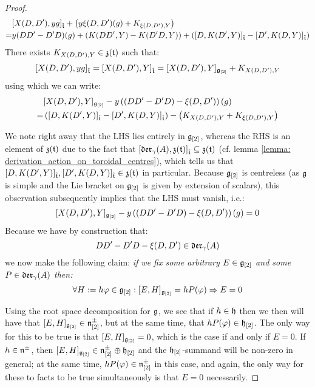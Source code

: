 \begin{proof}
                    $$
                        \begin{aligned}
                            & [ X(D, D') , y g ]_{\hat{\mathfrak{t}}} + \left( y \xi(D, D')(g) + K_{\xi(D, D'), Y} \right)
                            \\
                            = & y (DD' - D'D)( g ) + ( K(DD', Y) - K(D'D, Y) ) + ( [ D, K(D', Y) ]_{\hat{\mathfrak{t}}} - [ D', K(D, Y) ]_{\hat{\mathfrak{t}}} )
                        \end{aligned}
                    $$
                There exists $K_{X(D, D'), Y} \in \mathfrak{z}(\mathfrak{t})$ such that:
                    $$[ X(D, D') , y g ]_{\hat{\mathfrak{t}}} = [ X(D, D') , Y ]_{\hat{\mathfrak{t}}} = [X(D, D'), Y]_{\mathfrak{g}_{[2]}} + K_{X(D, D'), Y}$$
                using which we can write:
                    $$
                        \begin{aligned}
                            & [X(D, D'), Y]_{\mathfrak{g}_{[2]}} - y \left( ( DD' - D'D) - \xi(D, D') \right)( g )
                            \\
                            = & \left( [ D, K(D', Y) ]_{\hat{\mathfrak{t}}} - [ D', K(D, Y) ]_{\hat{\mathfrak{t}}} \right) - \left( K_{X(D, D'), Y} + K_{\xi(D, D'), Y} \right)
                        \end{aligned}
                    $$
                    
                We note right away that the LHS lies entirely in $\mathfrak{g}_{[2]}$, whereas the RHS is an element of $\mathfrak{z}(\mathfrak{t})$ due to the fact that $[\mathfrak{der}_{\gamma}(A), \mathfrak{z}(\mathfrak{t})]_{\hat{\mathfrak{t}}} \subseteq \mathfrak{z}(\mathfrak{t})$ (cf. lemma \ref{lemma: derivation_action_on_toroidal_centres}), which tells us that $[ D, K(D', Y) ]_{\hat{\mathfrak{t}}}, [ D', K(D, Y) ]_{\hat{\mathfrak{t}}} \in \mathfrak{z}(\mathfrak{t})$ in particular. Because $\mathfrak{g}_{[2]}$ is centreless (as $\mathfrak{g}$ is simple and the Lie bracket on $\mathfrak{g}_{[2]}$ is given by extension of scalars), this observation subsequently implies that the LHS must vanish, i.e.:
                    $$[X(D, D'), Y]_{\mathfrak{g}_{[2]}} - y \left( ( DD' - D'D) - \xi(D, D') \right)( g ) = 0$$
                Because we have by construction that:
                    $$DD' - D'D - \xi(D, D') \in \mathfrak{der}_{\gamma}(A)$$
                we now make the following claim: \textit{if we fix some arbitrary $E \in \mathfrak{g}_{[2]}$ and some $P \in \mathfrak{der}_{\gamma}(A)$ then:}
                    $$\forall H := h \varphi \in \mathfrak{g}_{[2]}: [E, H]_{\mathfrak{g}_{[2]}} = h P( \varphi ) \Rightarrow E = 0$$

                Using the root space decomposition for $\mathfrak{g}$, we see that if $h \in \mathfrak{h}$ then we then will have that $[E, H]_{\mathfrak{g}_{[2]}} \in \mathfrak{n}^{\pm}_{[2]}$, but at the same time, that $h P(\varphi) \in \mathfrak{h}_{[2]}$. The only way for this to be true is that $[E, H]_{\mathfrak{g}_{[2]}} = 0$, which is the case if and only if $E = 0$. If $h \in \mathfrak{n}^{\pm}$, then $[E, H]_{\mathfrak{g}_{[2]}} \in \mathfrak{n}^{\pm}_{[2]} \oplus \mathfrak{h}_{[2]}$ and the $\mathfrak{h}_{[2]}$-summand will be non-zero in general; at the same time, $h P(\varphi) \in \mathfrak{n}^{\pm}_{[2]}$ in this case, and again, the only way for these to facts to be true simultaneously is that $E = 0$ necessarily. 


\end{proof}
